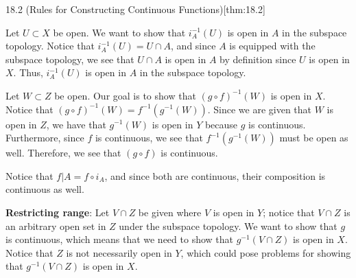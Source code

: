 \begin{thmBox}{18.2 (Rules for Constructing Continuous Functions)}[thm:18.2]
\begin{proofBox}
        \baseSkip 


        Let \( U \subset X \) be open. 
        We want to show that \( i_{ A }^{ -1 } ( U ) \) is open in \( A \) in
        the subspace topology.
        Notice that \( i_{ A }^{ -1 } ( U ) = U \cap A \), and since \( A \) is 
        equipped with the subspace topology, we see that \( U \cap A \) is open
        in \( A \) by definition since \( U \) is open in \( X \).
        Thus, \( i_{ A }^{ -1 } ( U ) \) is open in \( A \) in
        the subspace topology.

        \baseSkip


        Let \( W \subset Z \) be open.
        Our goal is to show that \( ( g \circ f )^{ -1 } ( W ) \) is open in 
        \( X \).
        Notice that \( ( g \circ f )^{ -1 } ( W ) = 
        f^{ -1 } ( g^{ -1 } ( W ) ) \).
        Since we are given that \( W \) is open in \( Z \), we have that 
        \( g^{ -1 } ( W ) \) is open in \( Y \) because \( g \) is continuous.
        Furthermore, since \( f \) is continuous, we see that 
        \( f^{ -1 } ( g^{ -1 } ( W ) ) \) must be open as well.
        Therefore, we see that \( ( g \circ f ) \) is continuous.

        \baseSkip


        Notice that \( f \vert A = f \circ i_{ A } \), and since both are 
        continuous, their composition is continuous as well.

        \baseSkip


        \textbf{Restricting range}:
        Let \( V \cap Z \) be given where \( V \) is open in \( Y \); notice 
        that \( V \cap Z \) is an arbitrary open set in \( Z \) under the 
        subspace topology.
        We want to show that \( g \) is continuous, which means that we need to
        show that \( g^{ -1 } ( V \cap Z ) \) is open in \( X \).   
        Notice that \( Z \) is not necessarily open in \( Y \), which 
        could pose problems for showing that \( g^{ -1 } ( V \cap Z ) \) is 
        open in \( X \).

        \baseSkip


\end{proofBox}
\end{thmBox}
